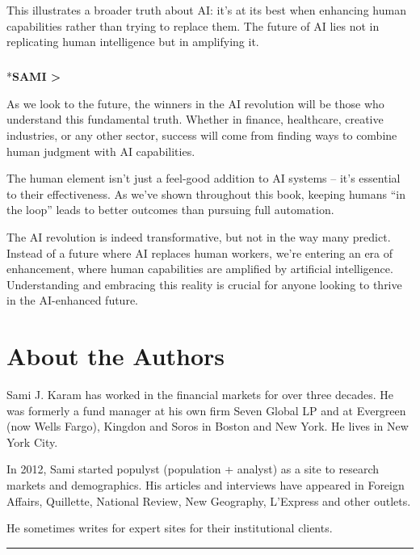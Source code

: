 \documentclass[
  Letterpaper,
]{scrbook}
\makeatletter
\let\oldparagraph\paragraph
\renewcommand{\paragraph}{
    \@ifstar
      \xxxParagraphStar
      \xxxParagraphNoStar
  }
\newcommand{\xxxParagraphStar}[1]{\oldparagraph*{#1}\mbox{}}
\newcommand{\xxxParagraphNoStar}[1]{\oldparagraph{#1}\mbox{}}
\makeatother
\begin{document}
This illustrates a broader truth about AI: it's at its best when
enhancing human capabilities rather than trying to replace them. The
future of AI lies not in replicating human intelligence but in
amplifying it.

\paragraph*{\texorpdfstring{\textbf{SAMI
\textgreater{}}}{SAMI \textgreater{}}}\label{sami-3}

As we look to the future, the winners in the AI revolution will be those
who understand this fundamental truth. Whether in finance, healthcare,
creative industries, or any other sector, success will come from finding
ways to combine human judgment with AI capabilities.

The human element isn't just a feel-good addition to AI systems -- it's
essential to their effectiveness. As we've shown throughout this book,
keeping humans ``in the loop'' leads to better outcomes than pursuing
full automation.

The AI revolution is indeed transformative, but not in the way many
predict. Instead of a future where AI replaces human workers, we're
entering an era of enhancement, where human capabilities are amplified
by artificial intelligence. Understanding and embracing this reality is
crucial for anyone looking to thrive in the AI-enhanced future.


\chapter{About the Authors}\label{about-the-authors}

Sami J. Karam has worked in the financial markets for over three
decades. He was formerly a fund manager at his own firm Seven Global LP
and at Evergreen (now Wells Fargo), Kingdon and Soros in Boston and New
York. He lives in New York City.

In 2012, Sami started populyst (population + analyst) as a site to
research markets and demographics. His articles and interviews have
appeared in Foreign Affairs, Quillette, National Review, New Geography,
L'Express and other outlets.

He sometimes writes for expert sites for their institutional clients.

\begin{center}\rule{0.5\linewidth}{0.5pt}\end{center}
\end{document}
